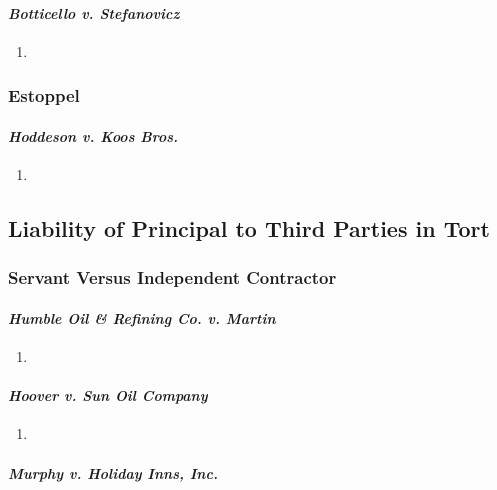 \paragraph{\emph{Botticello v. Stefanovicz}}

\begin{enumerate}
    \item %
\end{enumerate}

\subsubsection{Estoppel}

\paragraph{\emph{Hoddeson v. Koos Bros.}}

\begin{enumerate}
    \item %
\end{enumerate}

\subsection{Liability of Principal to Third Parties in Tort}

\subsubsection{Servant Versus Independent Contractor}

\paragraph{\emph{Humble Oil \& Refining Co. v. Martin}}

\begin{enumerate}
    \item %
\end{enumerate}

\paragraph{\emph{Hoover v. Sun Oil Company}}

\begin{enumerate}
    \item %
\end{enumerate}

\paragraph{\emph{Murphy v. Holiday Inns, Inc.}}

